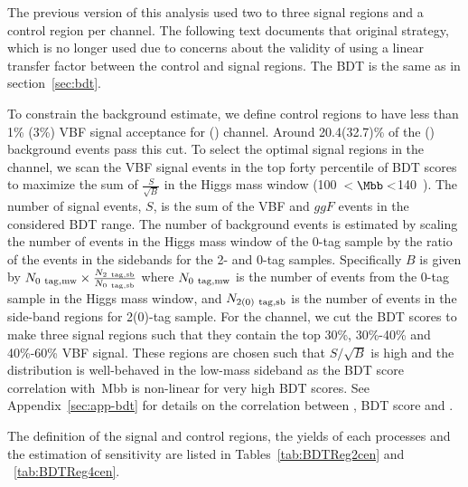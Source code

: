 
The previous version of this analysis used two to three signal regions and a control region per channel.  The following text documents that original strategy, which is no longer used due to concerns about the validity of using a linear transfer factor between the control and signal regions.  The BDT is the same as in section~\ref{sec:bdt}.


To constrain the background estimate, we define control regions to have less than 1\% (3\%) VBF signal acceptance for \twocentral(\fourcentral) channel. Around 20.4(32.7)\% of the \fourcentral(\twocentral) background events pass this cut. To select the optimal signal regions in the \fourcentral channel, we scan the VBF signal events in the top forty percentile of BDT scores to maximize the sum of $\frac{S}{\sqrt{B}}$ in the Higgs mass window (100~\GeV$<\Mbb<$140~\GeV).  The number of signal events, $S$, is the sum of the VBF and $ggF$ events in the considered BDT range.  The number of background events is estimated by scaling the number of events in the Higgs mass window of the 0-tag sample by the ratio of the events in the sidebands for the 2- and 0-tag samples. Specifically $B$ is given by $N_{\rm 0~tag, mw}\times \frac{N_{\rm 2~tag, sb}}{N_{\rm 0~tag, sb}}$ where  $N_{\rm 0~tag, mw}$ is the number of events from the 0-tag sample in the Higgs mass window, and $N_{\rm 2(0)~tag, sb}$ is the number of events in the side-band regions for 2(0)-tag sample. For the \twocentral channel, we cut the BDT scores to make three signal regions such that they contain the top 30\%, 30\%-40\% and 40\%-60\% VBF signal.   These regions are chosen such that $S/\sqrt{B}$ is high and the \Mbb{} distribution is well-behaved in the low-mass sideband as the BDT score correlation with\ Mbb{} is non-linear for very high BDT scores.  See Appendix~\ref{sec:app-bdt} for details on the correlation between \Mbb, BDT score and \pTbb. 

The definition of the signal and control regions, the yields of each processes and the estimation of sensitivity are listed in Tables~\ref{tab:BDTReg2cen} and ~\ref{tab:BDTReg4cen}. 
 


